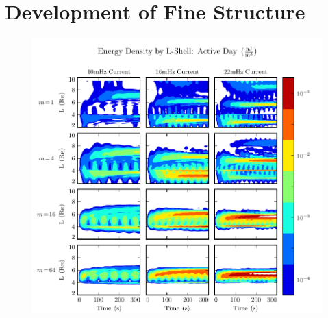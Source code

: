 \section{Development of Fine Structure}



\begin{figure}[H]
    \centering
    \includegraphics[width=\textwidth]{figures/ulayers_J_1.pdf}
    \caption[Energy Density by L-Shell: Active Day]{}
    \label{fig_ulayers_J_1}
\end{figure}

